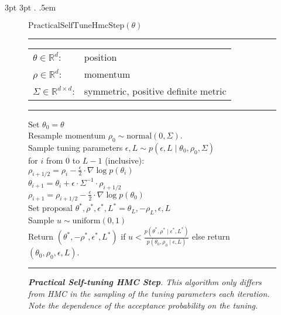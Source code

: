 
  {3pt} %
  {3pt} %
  {\normalfont\small} %
  {} %
  {\bfseries} %
  {.} %
  {.5em} %
  {} %
\theoremstyle{examplestyle}
\newtheorem{example}{Example}

\usepackage{environ}


\begin{figure}
\begin{flushleft}
$\textrm{PracticalSelfTuneHmcStep}(\theta)$
\vspace*{2pt}
\hrule
\vspace*{2pt}
\begin{tabular}{ll}
$\theta \in \mathbb{R}^d$: & position
\\
$\rho \in \mathbb{R}^d$: & momentum
\\
$\Sigma \in \mathbb{R}^{d \times d}$: & symmetric, positive definite metric
\end{tabular}
\vspace*{4pt}
\hrule
\vspace*{8pt}
Set $\theta_0 = \theta$
\\[4pt]
Resample momentum $\rho_0 \sim \textrm{normal}(0, \Sigma).$
\\[4pt]
Sample tuning parameters $\epsilon, L \sim p(\epsilon, L \mid \theta_0, \rho_0, \Sigma)$
\\[4pt]
for $i$ from $0$ to $L - 1$ (inclusive):
\\[2pt]
\null \qquad $\rho_{i + 1/2} = \rho_i - \frac{\epsilon}{2} \cdot \nabla \log p(\theta_i)$
\\[2pt]
\null \qquad $\theta_{i + 1} = \theta_i + \epsilon \cdot \Sigma^{-1} \cdot \rho_{i + 1/2}$
\\[2pt]
\null \qquad $\rho_{i + 1} = \rho_{i + 1/2} - \frac{\epsilon}{2} \cdot \nabla \log p(\theta_0)$
\\[6pt]
Set proposal $\theta^*, \rho^*, \epsilon^*, L^* = \theta_L, -\rho_L, \epsilon, L$ 
\\[4pt]
Sample $u \sim \textrm{uniform}(0, 1)$
\\[4pt]
Return $\left(\theta^*, -\rho^*, \epsilon^*, L^* \right)$ 
if $u < \frac{\displaystyle p(\theta^*, \rho^* \mid \epsilon^*, L^*)}
             {\displaystyle p(\theta_0, \rho_0 \mid \epsilon, L)}$
else return $\left( \theta_0, \rho_0, \epsilon, L \right)$.
\vspace*{4pt}
\hrule
\caption{\it {\bfseries Practical Self-tuning HMC Step}.  This algorithm only differs from HMC in the sampling of the  tuning parameters each iteration.  Note the dependence of the acceptance probability on the tuning.}
\label{fig:practical-self-tuning-hmc}
\end{flushleft}
\end{figure}


